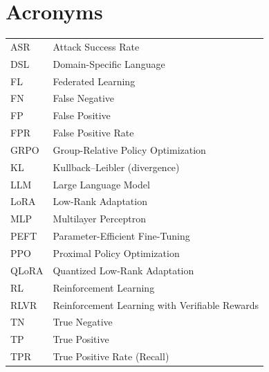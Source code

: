\chapter*{Acronyms}

\begin{tabular}{@{}ll@{}}
ASR & Attack Success Rate \\
DSL & Domain-Specific Language \\
FL & Federated Learning \\
FN & False Negative \\
FP & False Positive \\
FPR & False Positive Rate \\
GRPO & Group-Relative Policy Optimization \\
KL & Kullback--Leibler (divergence) \\
LLM & Large Language Model \\
LoRA & Low-Rank Adaptation \\
MLP & Multilayer Perceptron \\
PEFT & Parameter-Efficient Fine-Tuning \\
PPO & Proximal Policy Optimization \\
QLoRA & Quantized Low-Rank Adaptation \\
RL & Reinforcement Learning \\
RLVR & Reinforcement Learning with Verifiable Rewards \\
TN & True Negative \\
TP & True Positive \\
TPR & True Positive Rate (Recall) \\
\end{tabular}
